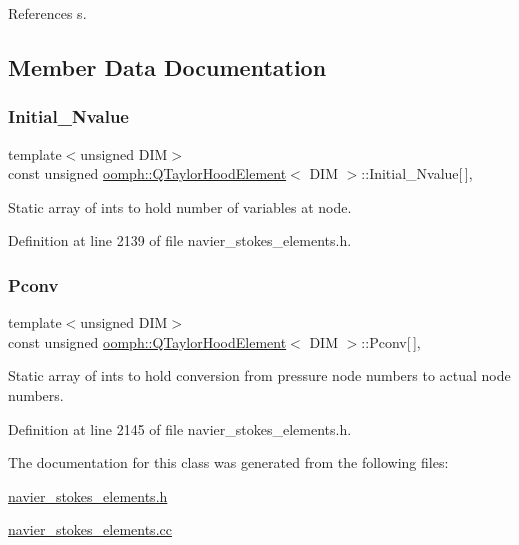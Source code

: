 References s.



\subsection{Member Data Documentation}
\mbox{\label{classoomph_1_1QTaylorHoodElement_aba97d853ebfed50187f024d27a386737}} 
\subsubsection{\texorpdfstring{Initial\+\_\+\+Nvalue}{Initial\_Nvalue}}
{\footnotesize\ttfamily template$<$unsigned D\+IM$>$ \\
const unsigned \hyperlink{classoomph_1_1QTaylorHoodElement}{oomph\+::\+Q\+Taylor\+Hood\+Element}$<$ D\+IM $>$\+::Initial\+\_\+\+Nvalue\mbox{[}$\,$\mbox{]}\hspace{0.3cm}{\ttfamily [static]}, {\ttfamily [private]}}



Static array of ints to hold number of variables at node. 



Definition at line 2139 of file navier\+\_\+stokes\+\_\+elements.\+h.

\mbox{\label{classoomph_1_1QTaylorHoodElement_a8756ec8b57d66a6c2e1feb8f7b264b03}} 
\subsubsection{\texorpdfstring{Pconv}{Pconv}}
{\footnotesize\ttfamily template$<$unsigned D\+IM$>$ \\
const unsigned \hyperlink{classoomph_1_1QTaylorHoodElement}{oomph\+::\+Q\+Taylor\+Hood\+Element}$<$ D\+IM $>$\+::Pconv\mbox{[}$\,$\mbox{]}\hspace{0.3cm}{\ttfamily [static]}, {\ttfamily [protected]}}



Static array of ints to hold conversion from pressure node numbers to actual node numbers. 



Definition at line 2145 of file navier\+\_\+stokes\+\_\+elements.\+h.



The documentation for this class was generated from the following files\+:\begin{DoxyCompactItemize}
\item 
\hyperlink{navier__stokes__elements_8h}{navier\+\_\+stokes\+\_\+elements.\+h}\item 
\hyperlink{navier__stokes__elements_8cc}{navier\+\_\+stokes\+\_\+elements.\+cc}\end{DoxyCompactItemize}
